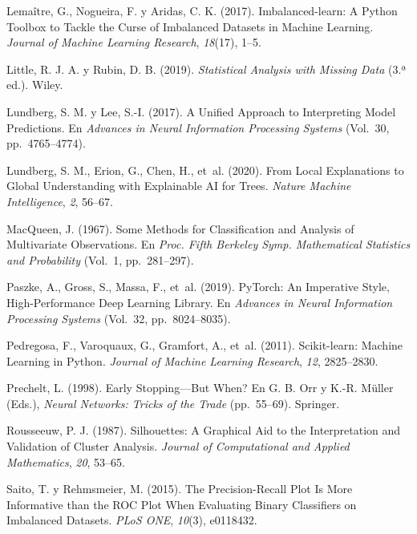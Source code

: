 \documentclass[conference,a4paper]{IEEEtran}
\begin{document}
\begin{thebibliography}{}
Lema{\^i}tre, G., Nogueira, F. y Aridas, C. K. (2017). Imbalanced-learn: A {Python} Toolbox to Tackle the Curse of Imbalanced Datasets in Machine Learning. \textit{Journal of Machine Learning Research}, \textit{18}(17), 1–5.

Little, R. J. A. y Rubin, D. B. (2019). \textit{Statistical Analysis with Missing Data} (3.ª ed.). Wiley.

Lundberg, S. M. y Lee, S.-I. (2017). A Unified Approach to Interpreting Model Predictions. En \textit{Advances in Neural Information Processing Systems} (Vol.~30, pp.~4765–4774).

Lundberg, S. M., Erion, G., Chen, H., et~al. (2020). From Local Explanations to Global Understanding with Explainable {AI} for Trees. \textit{Nature Machine Intelligence}, \textit{2}, 56–67.

MacQueen, J. (1967). Some Methods for Classification and Analysis of Multivariate Observations. En \textit{Proc. Fifth Berkeley Symp. Mathematical Statistics and Probability} (Vol.~1, pp.~281–297).

Paszke, A., Gross, S., Massa, F., et~al. (2019). {PyTorch}: An Imperative Style, High-Performance Deep Learning Library. En \textit{Advances in Neural Information Processing Systems} (Vol.~32, pp.~8024–8035).

Pedregosa, F., Varoquaux, G., Gramfort, A., et~al. (2011). Scikit-learn: Machine Learning in {Python}. \textit{Journal of Machine Learning Research}, \textit{12}, 2825–2830.

Prechelt, L. (1998). Early Stopping---But When? En G. B. Orr y K.-R. M{\"u}ller (Eds.), \textit{Neural Networks: Tricks of the Trade} (pp.~55–69). Springer.

Rousseeuw, P. J. (1987). Silhouettes: A Graphical Aid to the Interpretation and Validation of Cluster Analysis. \textit{Journal of Computational and Applied Mathematics}, \textit{20}, 53–65.

Saito, T. y Rehmsmeier, M. (2015). The Precision-Recall Plot Is More Informative than the {ROC} Plot When Evaluating Binary Classifiers on Imbalanced Datasets. \textit{PLoS ONE}, \textit{10}(3), e0118432.


\end{thebibliography}
\end{document}
